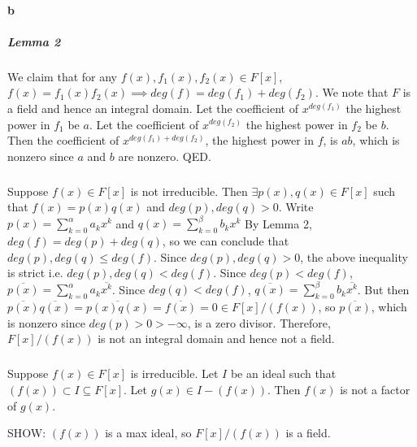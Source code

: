 \documentclass[]{article}
\begin{document}
	\paragraph{b}
	\subparagraph{Lemma 2}
	We claim that for any $f(x), f_1(x), f_2(x) \in F[x]$, $f(x) = f_1(x)f_2(x) \implies deg(f) = deg(f_1) + deg(f_2)$.\newline
	We note that $F$ is a field and hence an integral domain.\newline
	Let the coefficient of $x^{deg(f_1)}$ the highest power in $f_1$ be $a$.\newline
	Let the coefficient of $x^{deg(f_2)}$ the highest power in $f_2$ be $b$.\newline
	Then the coefficient of $x^{deg(f_1) + deg(f_2)}$, the highest power in $f$, is $ab$, which is nonzero since $a$ and $b$ are nonzero.\newline
	QED.
	\subparagraph{}
	Suppose $f(x) \in F[x]$ is not irreducible.\newline
	Then $\exists p(x), q(x) \in F[x]$ such that $f(x) = p(x)q(x)$ and $deg(p), deg(q) > 0$.\newline
	Write $p(x) = \sum_{k=0}^{\alpha} a_kx^k$ and $q(x) = \sum_{k=0}^{\beta} b_kx^k$
	By Lemma 2, $deg(f) = deg(p) + deg(q)$, so we can conclude that $deg(p), deg(q) \le deg(f)$.\newline
	Since $deg(p), deg(q) > 0$, the above inequality is strict i.e. $deg(p), deg(q) < deg(f)$.\newline
	Since $deg(p) < deg(f)$, $\overbar{p(x)} = \sum_{k=0}^{\alpha} a_k\overbar{x^k}$.\newline
	Since $deg(q) < deg(f)$, $\overbar{q(x)} = \sum_{k=0}^{\beta} b_k\overbar{x^k}$.\newline
	But then $\overbar{p(x)}\overbar{q(x)} = \overbar{p(x)q(x)} = \overbar{f(x)} = 0 \in F[x]/(f(x))$, so $\overbar{p(x)}$, which is nonzero since $deg(p) > 0 > -\infty$, is a zero divisor.\newline
	Therefore, $F[x]/(f(x))$ is not an integral domain and hence not a field.
	\subparagraph{}
	Suppose $f(x) \in F[x]$ is irreducible.\newline
	Let $I$ be an ideal such that $(f(x)) \subset I \subseteq F[x]$.\newline
	Let $g(x) \in I - (f(x))$. Then $f(x)$ is not a factor of $g(x)$.\newline
	
	SHOW: $(f(x))$ is a max ideal, so $F[x]/(f(x))$ is a field.
\end{document}
